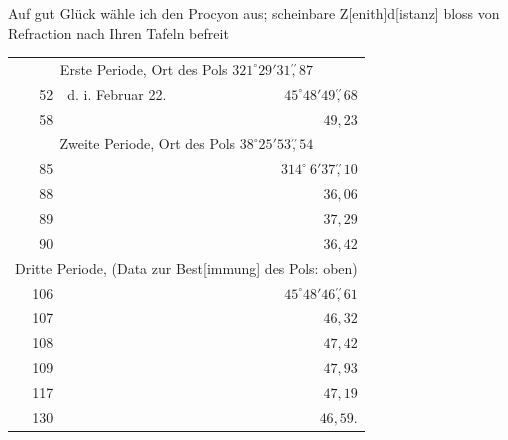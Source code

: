 \noindent\hspace*{\parindent}Auf gut Glück wähle ich den Procyon aus; scheinbare Z[enith]d[istanz] bloss von Refraction nach Ihren Tafeln befreit
\begin{center}\begingroup\setlength{\tabcolsep}{4pt}
\begin{tabular}{rlr}
\multicolumn{3}{c}{Erste Periode, Ort des Pols \(321^\circ29'31\overset{\prime\prime}{,}87\)}\\
52&d. i. Februar 22.&\(45^\circ48'49\overset{\prime\prime}{,}68\)\\
58&&\(\phantom{45^\circ48'}49{,}23\)\\[.7ex]
\multicolumn{3}{c}{Zweite Periode, Ort des Pols \(38^\circ25'53\overset{\prime\prime}{,}54\)}\\
85&&\(314^\circ\ 6'37\overset{\prime\prime}{,}10\)\\
88&&\(\phantom{314^\circ\ 6'}36{,}06\)\\
89&&\(\phantom{314^\circ\ 6'}37{,}29\)\\
90&&\(\phantom{314^\circ\ 6'}36{,}42\)\\[.7ex]
\multicolumn{3}{c}{Dritte Periode, (Data zur Best[immung] des Pols: oben)}\\
106&&\(45^\circ48'46\overset{\prime\prime}{,}61\)\\
107&&\(\phantom{45^\circ48'}46{,}32\)\\
108&&\(\phantom{45^\circ48'}47{,}42\)\\
109&&\(\phantom{45^\circ48'}47{,}93\)\\
117&&\(\phantom{45^\circ48'}47{,}19\)\\
130&&\(\phantom{45^\circ48'}46{,}59.\)
\end{tabular}\par\endgroup\end{center}

